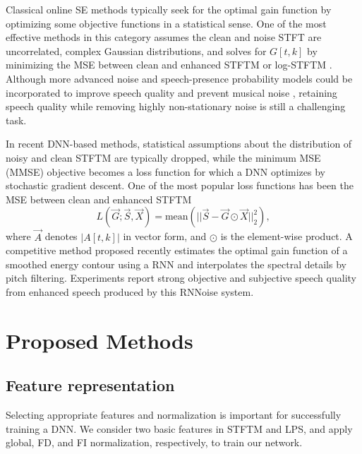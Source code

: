 \documentclass{article}
\begin{document}
Classical online SE methods typically seek for the optimal gain function by optimizing some objective functions in a statistical sense. One of the most effective methods in this category assumes the clean and noise \ac{STFT} are uncorrelated, complex Gaussian distributions, and solves for $G[t,k]$ by minimizing the \ac{MSE} between clean and enhanced \ac{STFTM} \cite{ephraim1984speech} or log-\ac{STFTM} \cite{ephraim1985speech}. Although more advanced noise and speech-presence probability models could be incorporated to improve speech quality and prevent musical noise \cite{cohen2002noise, cohen2001speech}, retaining speech quality while removing highly non-stationary noise is still a challenging task.

In recent DNN-based methods, statistical assumptions about the distribution of noisy and clean \ac{STFTM} are typically dropped, while the minimum \ac{MSE} (MMSE) objective becomes a loss function for which a DNN optimizes by stochastic gradient descent. One of the most popular loss functions has been the \ac{MSE} between clean and enhanced \ac{STFTM}
\begin{equation}\label{mse}
L(\vec{G}; \vec{S}, \vec{X}) = \text{mean}(||\vec{S}-\vec{G}\odot\vec{X}||^2_2),
\end{equation}
where $\vec{A}$ denotes $|A[t,k]|$ in vector form, and $\odot$ is the element-wise product. A competitive method proposed recently \cite{valin2018hybrid} estimates the optimal gain function of a smoothed energy contour using a \ac{RNN} and interpolates the spectral details by pitch filtering. Experiments \cite{valin2018hybrid,Reddy2019} report strong objective and subjective speech quality from enhanced speech produced by this RNNoise system.

\section{Proposed Methods}
\label{sec:method}

\subsection{Feature representation}

Selecting appropriate features and normalization is important for successfully training a DNN. We consider two basic features in \ac{STFTM} and \ac{LPS}, and apply global, \ac{FD}, and \ac{FI} normalization, respectively, to train our network.
\end{document}
